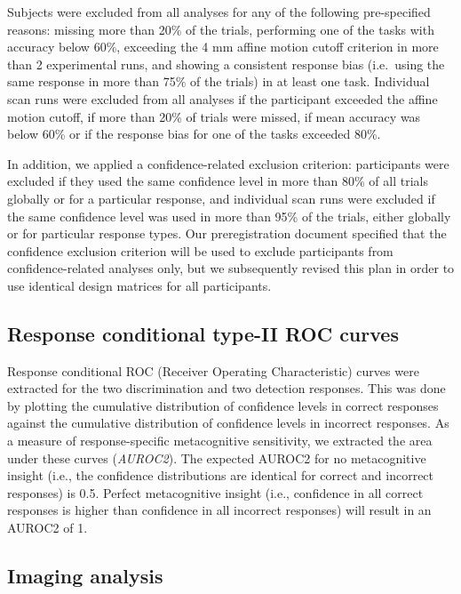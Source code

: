 \documentclass[12pt,twoside]{reedthesis}
\begin{document}
Subjects were excluded from all analyses for any of the following pre-specified reasons: missing more than 20\% of the trials, performing one of the tasks with accuracy below 60\%, exceeding the 4 mm affine motion cutoff criterion in more than 2 experimental runs, and showing a consistent response bias (i.e.~using the same response in more than 75\% of the trials) in at least one task. Individual scan runs were excluded from all analyses if the participant exceeded the affine motion cutoff, if more than 20\% of trials were missed, if mean accuracy was below 60\% or if the response bias for one of the tasks exceeded 80\%.

In addition, we applied a confidence-related exclusion criterion: participants were excluded if they used the same confidence level in more than 80\% of all trials globally or for a particular response, and individual scan runs were excluded if the same confidence level was used in more than 95\% of the trials, either globally or for particular response types. Our preregistration document specified that the confidence exclusion criterion will be used to exclude participants from confidence-related analyses only, but we subsequently revised this plan in order to use identical design matrices for all participants.

\hypertarget{response-conditional-type-ii-roc-curves}{%
\subsection{Response conditional type-II ROC curves}\label{response-conditional-type-ii-roc-curves}}

Response conditional ROC (Receiver Operating Characteristic) curves were extracted for the two discrimination and two detection responses. This was done by plotting the cumulative distribution of confidence levels in correct responses against the cumulative distribution of confidence levels in incorrect responses. As a measure of response-specific metacognitive sensitivity, we extracted the area under these curves (\emph{AUROC2}). The expected AUROC2 for no metacognitive insight (i.e., the confidence distributions are identical for correct and incorrect responses) is 0.5. Perfect metacognitive insight (i.e., confidence in all correct responses is higher than confidence in all incorrect responses) will result in an AUROC2 of 1.

\hypertarget{imaging-analysis}{%
\subsection{Imaging analysis}\label{imaging-analysis}}
\end{document}
